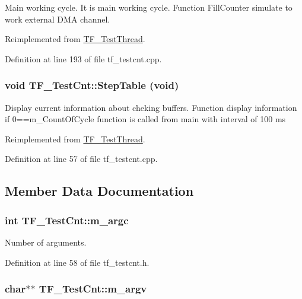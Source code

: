 Main working cycle. It is main working cycle. Function FillCounter simulate to work external DMA channel. 

Reimplemented from \hyperlink{classTF__TestThread_ab581c9fb725595dff5ffc400a96886a0}{TF\_\-TestThread}.

Definition at line 193 of file tf\_\-testcnt.cpp.\hypertarget{classTF__TestCnt_ac1a136199115958172e96ef4c9212351}{
\subsubsection[{StepTable}]{\setlength{\rightskip}{0pt plus 5cm}void TF\_\-TestCnt::StepTable (void)}}
\label{classTF__TestCnt_ac1a136199115958172e96ef4c9212351}


Display current information about cheking buffers. Function display information if 0==m\_\-CountOfCycle function is called from main with interval of 100 ms 

Reimplemented from \hyperlink{classTF__TestThread_a25569ec704c682eed81abd63e05adf2a}{TF\_\-TestThread}.

Definition at line 57 of file tf\_\-testcnt.cpp.

\subsection{Member Data Documentation}
\hypertarget{classTF__TestCnt_ae5c1457ee61a41a35a721fcd064892cb}{
\subsubsection[{m\_\-argc}]{\setlength{\rightskip}{0pt plus 5cm}int {\bf TF\_\-TestCnt::m\_\-argc}}}
\label{classTF__TestCnt_ae5c1457ee61a41a35a721fcd064892cb}


Number of arguments. 

Definition at line 58 of file tf\_\-testcnt.h.\hypertarget{classTF__TestCnt_a488e38fc6a844dbbf7ec8304717524ef}{
\subsubsection[{m\_\-argv}]{\setlength{\rightskip}{0pt plus 5cm}char$\ast$$\ast$ {\bf TF\_\-TestCnt::m\_\-argv}}}
\label{classTF__TestCnt_a488e38fc6a844dbbf7ec8304717524ef}


